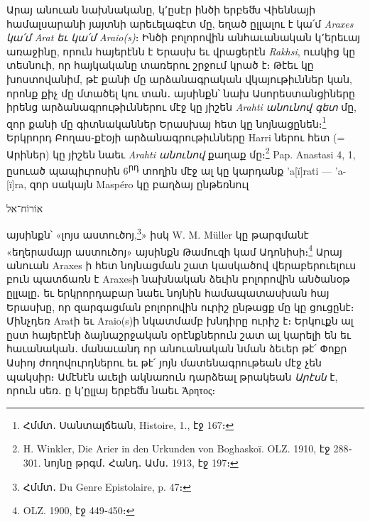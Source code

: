 \documentclass{article}
\begin{document}
{Արայ անուան նախնականը, կ՚ըսէր ինծի երբեﬓ Վիեննայի համալսարանի յայտնի արեւելագէտ մը, եղած ըլլալու է կա՛մ \emph{Araxes կա՛մ Arat եւ կա՛մ Araio(s)}։ Ինծի բոլորովին անհաւանական կ՚երեւայ առաջինը, որուն հայերէնն է Երասխ եւ վրացերէն \emph{Rakhsi}, ուսկից կը տեսնուի, որ հայկականը տառերու շրջում կրած է։ Թէեւ կը խոստովանիմ, թէ քանի մը արձանագրական վկայութիւններ կան, որոնք քիչ մը մտածել կու տան․ այսինքն՝ նախ Ասորեստանցիները իրենց արձանագրութիւններու մէջ կը յիշեն \emph{Arahti անունով գետ} մը, զոր քանի մը գիտնականներ Երասխայ հետ կը նոյնացընեն։\footnote{Հմմտ․ Սանտալճեան, Histoire, 1., էջ 167։} Երկրորդ Բողաս֊քէօյի արձանագրութիւնները Harri ներու հետ (= Արիներ) կը յիշեն նաեւ \emph{Arahti անունով} քաղաք մը։\footnote{H. Winkler, Die Arier in den Urkunden von Boghaskoï. OLZ. 1910, էջ 288֊301. նոյնը թրգմ․ Հանդ․ Ամս․ 1913, էջ 197։} Pap. Anastasi 4, 1, ըսուած պապիւրոսին 6\textsuperscript{րդ} տողին մէջ ալ կը կարդանք 'a[ï]rati — 'a-[ï]ra, զոր սակայն Maspéro կը բաղձայ ընթեռնուլ \begin{hebrewfont}אוֹרוֹח־אל\end{hebrewfont} այսինքն՝ «լոյս աստուծոյ,\footnote{Հմմտ․ Du Genre Epistolaire, p. 47։}» իսկ W. M. Müller կը թարգմանէ «եղերամայր աստուծոյ» այսինքն Թամուզի կամ Ադոնիսի։\footnote{OLZ. 1900, էջ 449֊450։} Արայ անուան Araxes ի հետ նոյնացման շատ կասկածով վերաբերուելուս բուն պատճառն է Araxesի նախնական ձեւին բոլորովին անծանօթ ըլլալը․ եւ երկրորդաբար նաեւ նոյնին համապատասխան հայ Երասխը, որ զարգացման բոլորովին ուրիշ ընթացք մը կը ցուցընէ։ Մինչդեռ Aratի եւ Araio(s)ի նկատմամբ խնդիրը ուրիշ է։ Երկուքն ալ ըստ հայերէնի ձայնաշրջական օրէնքներուն շատ ալ կարելի են եւ հաւանական․ մանաւանդ որ անուանական նման ձեւեր թէ՛ Փոքր Ասիոյ ժողովուրդներու եւ թէ՛ յոյն մատենագրութեան մէջ չեն պակսիր։ Ամէնէն աւելի ակնառուն դարձեալ թրակեան \emph{Արէսն} է, որուն սեռ․ ը կ՚ըլլայ երբեﬓ նաեւ Ἀρητος։

}
\end{document}
